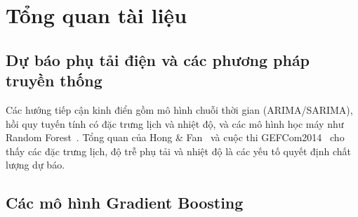 \section{Tổng quan tài liệu}\label{sec:lit}
\subsection{Dự báo phụ tải điện và các phương pháp truyền thống}\label{sec:lit-general}
Các hướng tiếp cận kinh điển gồm mô hình chuỗi thời gian (ARIMA/SARIMA), hồi quy tuyến tính có đặc trưng
lịch và nhiệt độ, và các mô hình học máy như Random Forest~\cite{breiman2001random}. Tổng quan của
Hong \& Fan~\cite{hong2016probabilistic} và cuộc thi GEFCom2014~\cite{hong2016gefcom} cho thấy các đặc trưng
lịch, độ trễ phụ tải và nhiệt độ là các yếu tố quyết định chất lượng dự báo.


\subsection{Các mô hình Gradient Boosting}\label{sec:lit-boosting}
